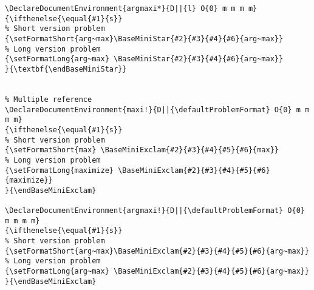 \documentclass[a4paper]{article}
\begin{document}
\begin{lstlisting}
\DeclareDocumentEnvironment{argmaxi*}{D||{l} O{0} m m m m}
{\ifthenelse{\equal{#1}{s}}
% Short version problem
{\setFormatShort{arg~max}\BaseMiniStar{#2}{#3}{#4}{#6}{arg~max}}
% Long version problem	
{\setFormatLong{arg~max} \BaseMiniStar{#2}{#3}{#4}{#6}{arg~max}}
}{\textbf{\endBaseMiniStar}}


% Multiple reference
\DeclareDocumentEnvironment{maxi!}{D||{\defaultProblemFormat} O{0} m m m m}
{\ifthenelse{\equal{#1}{s}}
% Short version problem
{\setFormatShort{max} \BaseMiniExclam{#2}{#3}{#4}{#5}{#6}{max}}
% Long version problem	
{\setFormatLong{maximize} \BaseMiniExclam{#2}{#3}{#4}{#5}{#6}{maximize}}
}{\endBaseMiniExclam}

\DeclareDocumentEnvironment{argmaxi!}{D||{\defaultProblemFormat} O{0} m m m m}
{\ifthenelse{\equal{#1}{s}}
% Short version problem
{\setFormatShort{arg~max}\BaseMiniExclam{#2}{#3}{#4}{#5}{#6}{arg~max}}
% Long version problem	
{\setFormatLong{arg~max} \BaseMiniExclam{#2}{#3}{#4}{#5}{#6}{arg~max}}
}{\endBaseMiniExclam}
\end{lstlisting}
\end{document}
